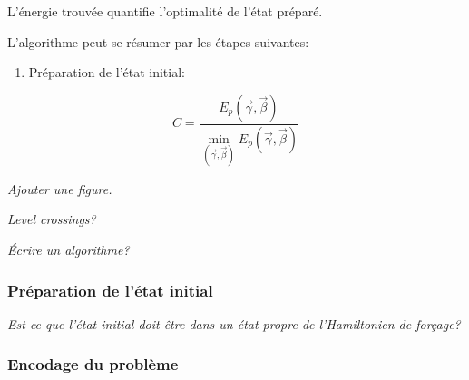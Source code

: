 L'énergie trouvée quantifie l'optimalité de l'état préparé.

L'algorithme peut se résumer par les étapes suivantes:

\begin{enumerate}
    \item Préparation de l'état initial:
\end{enumerate}

\begin{equation}
    C = \frac{ E_{p} (\vec{\gamma}, \vec{\beta})}{\min_{(\vec{\gamma}, \vec{\beta})} E_{p} (\vec{\gamma}, \vec{\beta}) }
\end{equation}


\textcolor{mydarkred}{\textit{Ajouter une figure.}}

\textcolor{mydarkred}{\textit{Level crossings?}}

\textcolor{mydarkred}{\textit{Écrire un algorithme?}}


\subsubsection{Préparation de l'état initial}
\label{subsec:encodage-probleme}

\textcolor{mydarkred}{\textit{Est-ce que l'état initial doit être dans un état propre de l'Hamiltonien de forçage?}}


\subsubsection{Encodage du problème}
\label{subsec:encodage-probleme}

